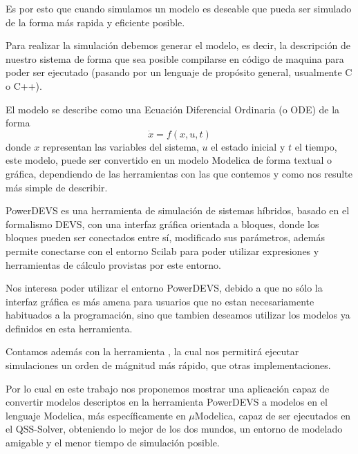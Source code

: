 Es por esto que cuando simulamos un modelo es deseable que pueda ser simulado de la forma más rapida y eficiente posible.

Para realizar la simulación debemos generar el modelo, es decir, la descripción de nuestro sistema de forma que sea posible compilarse en código de maquina para poder ser ejecutado (pasando por un lenguaje de propósito general, usualmente C o C++). 

El modelo se describe como una Ecuación Diferencial Ordinaria (o ODE) de la forma
\begin{equation*}
	\dot{x} = f(x, u, t)
\end{equation*}
donde $x$ representan las variables del sistema, $u$ el estado inicial y $t$ el tiempo, este modelo, puede ser convertido en un modelo Modelica\cite{Fri98}\cite{Fritzson02modelica} de forma textual o gráfica, dependiendo de las herramientas con las que contemos y como nos resulte más simple de describir.

PowerDEVS\cite{BK11} es una herramienta de simulación de sistemas híbridos, basado en el formalismo DEVS\cite{Zeigler}, con una interfaz gráfica orientada a bloques, donde los bloques pueden ser conectados entre sí, modificado sus parámetros, además permite conectarse con el entorno Scilab para poder utilizar expresiones y herramientas de cálculo provistas por este entorno.

Nos interesa poder utilizar el entorno PowerDEVS\cite{BK11}, debido a que no sólo la interfaz gráfica es más amena para usuarios que no estan necesariamente habituados a la programación, sino que tambien deseamos utilizar los modelos ya definidos en esta herramienta.

Contamos además con la herramienta \cite{Ber12}, la cual nos permitirá ejecutar simulaciones un orden de mágnitud más rápido, que otras implementaciones.

Por lo cual en este trabajo nos proponemos mostrar una aplicación capaz de convertir modelos descriptos en la herramienta PowerDEVS\cite{BK11} a modelos en el lenguaje Modelica\cite{Fri98}\cite{Fritzson02modelica}, más específicamente en $\mu$Modelica\cite{Ber12}, capaz de ser ejecutados en el QSS-Solver\cite{Ber12}, obteniendo lo mejor de los dos mundos, un entorno de modelado amigable y el menor tiempo de simulación posible.


